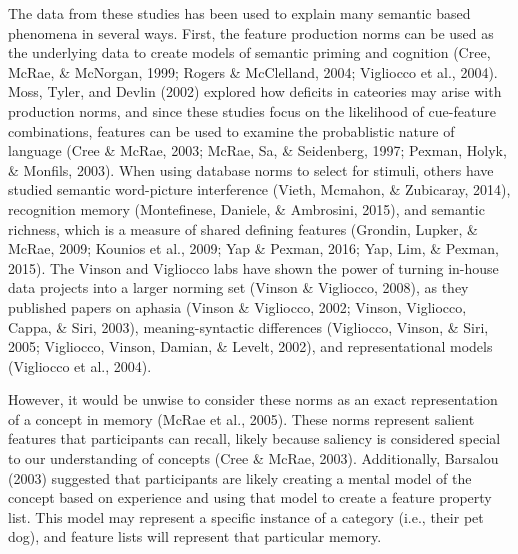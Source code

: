 \documentclass[english,man]{apa6}
\theoremstyle{definition}
\theoremstyle{definition}
\theoremstyle{definition}
\theoremstyle{remark}
\begin{document}
The data from these studies has been used to explain many semantic based
phenomena in several ways. First, the feature production norms can be
used as the underlying data to create models of semantic priming and
cognition (Cree, McRae, \& McNorgan, 1999; Rogers \& McClelland, 2004;
Vigliocco et al., 2004). Moss, Tyler, and Devlin (2002) explored how
deficits in cateories may arise with production norms, and since these
studies focus on the likelihood of cue-feature combinations, features
can be used to examine the probablistic nature of language (Cree \&
McRae, 2003; McRae, Sa, \& Seidenberg, 1997; Pexman, Holyk, \& Monfils,
2003). When using database norms to select for stimuli, others have
studied semantic word-picture interference (Vieth, Mcmahon, \&
Zubicaray, 2014), recognition memory (Montefinese, Daniele, \&
Ambrosini, 2015), and semantic richness, which is a measure of shared
defining features (Grondin, Lupker, \& McRae, 2009; Kounios et al.,
2009; Yap \& Pexman, 2016; Yap, Lim, \& Pexman, 2015). The Vinson and
Vigliocco labs have shown the power of turning in-house data projects
into a larger norming set (Vinson \& Vigliocco, 2008), as they published
papers on aphasia (Vinson \& Vigliocco, 2002; Vinson, Vigliocco, Cappa,
\& Siri, 2003), meaning-syntactic differences (Vigliocco, Vinson, \&
Siri, 2005; Vigliocco, Vinson, Damian, \& Levelt, 2002), and
representational models (Vigliocco et al., 2004).

However, it would be unwise to consider these norms as an exact
representation of a concept in memory (McRae et al., 2005). These norms
represent salient features that participants can recall, likely because
saliency is considered special to our understanding of concepts (Cree \&
McRae, 2003). Additionally, Barsalou (2003) suggested that participants
are likely creating a mental model of the concept based on experience
and using that model to create a feature property list. This model may
represent a specific instance of a category (i.e., their pet dog), and
feature lists will represent that particular memory.
\end{document}
